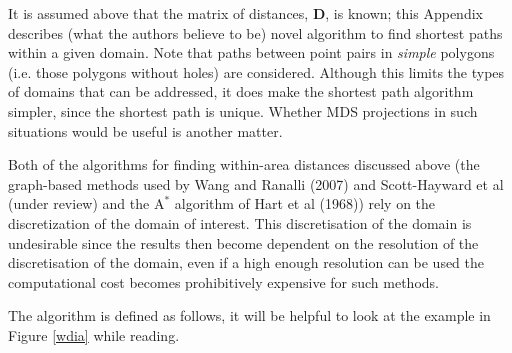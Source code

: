 \documentclass{article}
\begin{document}
It is assumed above that the matrix of distances, $\mathbf{D}$, is known; this Appendix describes (what the authors believe to be) novel algorithm to find shortest paths within a given domain. Note that paths between point pairs in \textit{simple} polygons (i.e. those polygons without holes) are considered. Although this limits the types of domains that can be addressed, it does make the shortest path algorithm simpler, since the shortest path is unique. Whether MDS projections in such situations would be useful is another matter.

Both of the algorithms for finding within-area distances discussed above (the graph-based methods used by Wang and Ranalli (2007) and Scott-Hayward et al (under review) and the $\text{A}^*$ algorithm of Hart et al (1968)) rely on the discretization of the domain of interest. This discretisation of the domain is undesirable since the results then become dependent on the resolution of the discretisation of the domain, even if a high enough resolution can be used the computational cost becomes prohibitively expensive for such methods.

The algorithm is defined as follows, it will be helpful to look at the example in Figure \ref{wdia} while reading.
\end{document}

